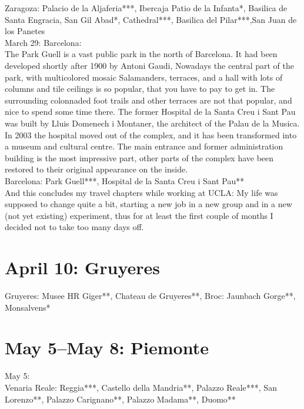 Zaragoza: Palacio de la Aljaferia***, Ibercaja Patio de la Infanta*, Basilica de Santa Engracia, San Gil Abad*, Cathedral***, Basilica del Pilar***,San Juan de los Panetes\\

March 29: Barcelona:\\
The Park Guell is a vast public park in the north of Barcelona. It had been developed shortly after 1900 by Antoni Gaudi, Nowadays the central part of the park, with multicolored mosaic Salamanders, terraces, and a hall with lots of columns and tile ceilings is so popular, that you have to pay to get in. The surrounding colonnaded foot trails and other terraces are not that popular, and nice to spend some time there. The former Hospital de la Santa Creu i Sant Pau was built by Lluis Domenech i Montaner, the architect of the Palau de la Musica. In 2003 the hospital moved out of the complex, and it has been transformed into a museum and cultural centre. The main entrance and former administration building is the most impressive part, other parts of the complex have been restored to their original appearance on the inside.\\

Barcelona: Park Guell***, Hospital de la Santa Creu i Sant Pau**\\

And this concludes my travel chapters while working at UCLA: My life was supposed to change quite a bit, starting a new job in a new group and in a new (not yet existing) experiment, thus for at least the first couple of months I decided not to take too many days off.\\

\section{April 10: Gruyeres}
\label{2016Gruyeres}

Gruyeres: Musee HR Giger**, Chateau de Gruyeres**, Broc: Jaunbach Gorge**, Monsalvens*

\section{May 5--May 8: Piemonte}

May 5:\\
Venaria Reale: Reggia***, Castello della Mandria**, Palazzo Reale***, San Lorenzo**, Palazzo Carignano**, Palazzo Madama**, Duomo**\\


